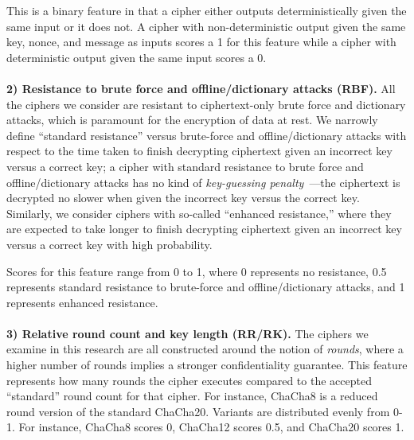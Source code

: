 This is a binary feature in that a cipher either outputs deterministically given
the same input or it does not. A cipher with non-deterministic output given the
same key, nonce, and message as inputs scores a 1 for this feature while a
cipher with deterministic output given the same input scores a 0.\\
\\
\textbf{2) Resistance to brute force and offline/dictionary attacks (RBF).}
All the ciphers we consider are resistant to ciphertext-only brute force and
dictionary attacks, which is paramount for the encryption of data at rest. We
narrowly define ``standard resistance'' versus brute-force and
offline/dictionary attacks with respect to the time taken to finish decrypting
ciphertext given an incorrect key versus a correct key; a cipher with standard
resistance to brute force and offline/dictionary attacks has no kind of
\emph{key-guessing penalty}~\cite{Freestyle}---the ciphertext is decrypted no
slower when given the incorrect key versus the correct key. Similarly, we
consider ciphers with so-called ``enhanced resistance,'' where they are expected
to take longer to finish decrypting ciphertext given an incorrect key versus a
correct key with high probability.

Scores for this feature range from 0 to 1, where 0 represents no resistance,
0.5 represents standard resistance to brute-force and offline/dictionary
attacks, and 1 represents enhanced resistance.\\
\\
\textbf{3) Relative round count and key length (RR/RK).} The ciphers we examine
in this research are all constructed around the notion of \emph{rounds}, where a
higher number of rounds implies a stronger confidentiality guarantee. This
feature represents how many rounds the cipher executes compared to the accepted
``standard'' round count for that cipher. For instance, ChaCha8 is a reduced round
version of the standard ChaCha20. Variants are distributed evenly from 0-1. For
instance, ChaCha8 scores 0, ChaCha12 scores 0.5, and ChaCha20 scores 1\@.

